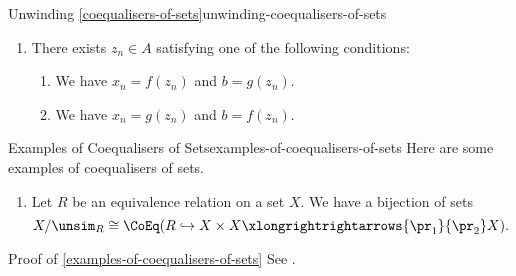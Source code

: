 \begin{remark}{Unwinding \cref{coequalisers-of-sets}}{unwinding-coequalisers-of-sets}
\begin{itemize}
\begin{itemize}
\begin{enumerate}
\begin{enumerate}
                            \end{enumerate}
                        \item There exists $z_{n}\in A$ satisfying one of the following conditions:
                            \begin{enumerate}
                                \item We have $x_{n}=f(z_{n})$ and $b=g(z_{n})$.
                                \item We have $x_{n}=g(z_{n})$ and $b=f(z_{n})$.
                            \end{enumerate}
                    \end{enumerate}
            \end{itemize}
    \end{itemize}
\end{remark}
\begin{example}{Examples of Coequalisers of Sets}{examples-of-coequalisers-of-sets}%
    Here are some examples of coequalisers of sets.
    \begin{enumerate}
        \item\label{examples-of-coequalisers-of-sets-quotients-by-equivalence-relations}Let $R$ be an equivalence relation on a set $X$. We have a bijection of sets
            \[
                X/\unsim_{R}%
                \cong%
                \CoEq(R\hookrightarrow X\times X\xlongrightrightarrows{\pr_{1}}{\pr_{2}}X).
            \]%
    \end{enumerate}
\end{example}
\begin{Proof}{Proof of \cref{examples-of-coequalisers-of-sets}}%
    See \cite{proof-wiki:quotient-map-is-coequaliser}.
\end{Proof}
